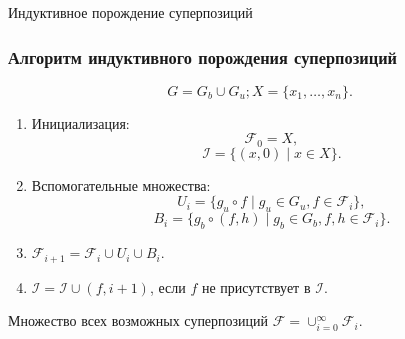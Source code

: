 \documentclass{beamer}
\begin{document}
\begin{frame}{Индуктивное порождение суперпозиций}
  \frametitle{Алгоритм индуктивного порождения суперпозиций}
	
	\[
	G = G_b \cup G_u; X = \{ x_1, \dots, x_n \}.
	\]

	\begin{enumerate}
	  \item Инициализация:
		\[
		  \mathcal{F}_0 = X,
		\]
		\[
		  \mathcal{I} = \{ (x, 0) \mid x \in X \}.
		\]
	  \item Вспомогательные множества:
		\[
		  U_i = \{ g_u \circ f \mid g_u \in G_u, f \in \mathcal{F}_i \},
		\]
		\[
		  B_i = \{ g_b \circ (f, h) \mid g_b \in G_b, f, h \in \mathcal{F}_i \}.
		\]
	  \item $\mathcal{F}_{i+1} = \mathcal{F}_i \cup U_i \cup B_i$.
	  \item $\mathcal{I} = \mathcal{I} \cup (f, i + 1)$, если $f$ не присутствует
		в $\mathcal{I}$.
	\end{enumerate}

	Множество всех возможных суперпозиций $\mathcal{F} = \cup_{i=0}^{\infty} \mathcal{F}_i$.
\end{frame}

%
%
\end{document}

